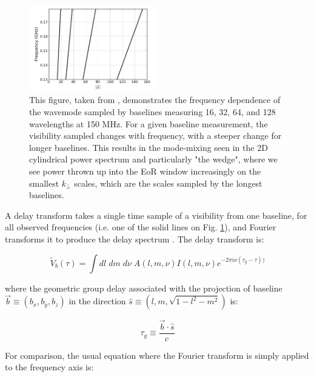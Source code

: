 \begin{figure}
\begin{center}
    \includegraphics[width=0.5\textwidth]{Images/baselines.png}
\end{center}
    \caption{This figure, taken from \citet{Parsons2012ApJ...756..165P}, demonstrates the frequency dependence of the wavemode sampled by baselines measuring 16, 32, 64, and 128 wavelengths at 150 MHz. For a given baseline measurement, the visibility sampled changes with frequency, with a steeper change for longer baselines. This results in the mode-mixing seen in the 2D cylindrical power spectrum and particularly "the wedge", where we see power thrown up into the EoR window increasingly on the smallest $k_\bot$ scales, which are the scales sampled by the longest baselines.}
    \label{fig:baselines}
\end{figure}

A delay transform takes a single time sample of a visibility from one baseline, for all observed frequencies (i.e. one of the solid lines on Fig. \ref{fig:baselines}), and Fourier transforms it to produce the delay spectrum \citet{Parsons2012ApJ...756..165P,Parsons2012ApJ...753...81P,Parsons2009AJ....138..219P}. The delay transform is:

\begin{equation}
    \widetilde{V}_b(\tau) = \int dl \; dm \; d\nu \; A(l,m,\nu)I(l,m,\nu)e^{-2\pi i\nu(\tau_g-\tau))}
\end{equation}

\noindent where the geometric group delay associated with the projection of baseline $\overrightarrow{b} \equiv (b_x,b_y,b_z) $ in the direction $ \hat{s} \equiv (l,m,\sqrt{1-l^2-m^2})$ is:

\begin{equation}
    \tau_g \equiv \frac{\overrightarrow{b} \cdot \hat{s}}{c} 
\end{equation}

For comparison, the usual equation where the Fourier transform is simply applied to the frequency axis is:

